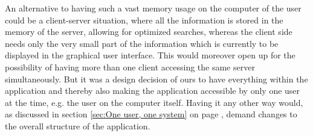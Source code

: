 An alternative to having such a vast memory usage on the computer of the user could be a client-server situation, where all the information is stored in the memory of the server, allowing for optimized searches, whereas the client side needs only the very small part of the information which is currently to be displayed in the graphical user interface. This would moreover open up for the possibility of having more than one client accessing the same server simultaneously. But it was a design decision of ours to have everything within the application and thereby also making the application accessible by only one user at the time, e.g. the user on the computer itself. Having it any other way would, as discussed in section \ref{sec:One user, one system} on page \pageref{sec:One user, one system}, demand changes to the overall structure of the application.
